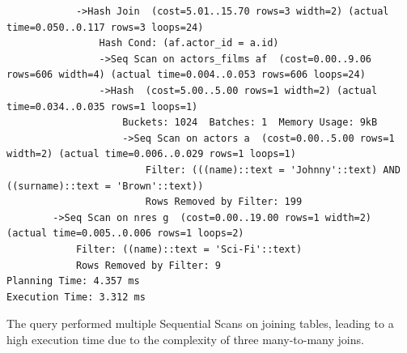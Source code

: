 \documentclass[11pt, a4paper]{article}
\begin{document}
\begin{lstlisting}
            ->Hash Join  (cost=5.01..15.70 rows=3 width=2) (actual time=0.050..0.117 rows=3 loops=24)
                Hash Cond: (af.actor_id = a.id)
                ->Seq Scan on actors_films af  (cost=0.00..9.06 rows=606 width=4) (actual time=0.004..0.053 rows=606 loops=24)
                ->Hash  (cost=5.00..5.00 rows=1 width=2) (actual time=0.034..0.035 rows=1 loops=1)
                    Buckets: 1024  Batches: 1  Memory Usage: 9kB
                    ->Seq Scan on actors a  (cost=0.00..5.00 rows=1 width=2) (actual time=0.006..0.029 rows=1 loops=1)
                        Filter: (((name)::text = 'Johnny'::text) AND ((surname)::text = 'Brown'::text))
                        Rows Removed by Filter: 199
        ->Seq Scan on nres g  (cost=0.00..19.00 rows=1 width=2) (actual time=0.005..0.006 rows=1 loops=2)
            Filter: ((name)::text = 'Sci-Fi'::text)
            Rows Removed by Filter: 9
Planning Time: 4.357 ms
Execution Time: 3.312 ms
\end{lstlisting}
The query performed multiple Sequential Scans on joining tables, leading to a high execution time due to the complexity of three many-to-many joins.
\end{document}
